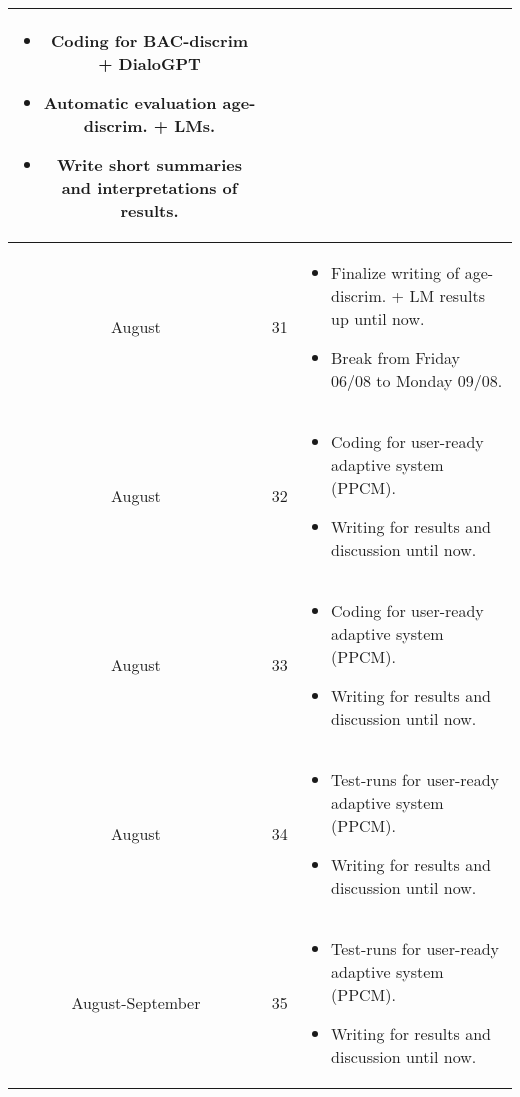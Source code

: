\begin{longtable}{| c | c | m{10cm} |}
\begin{itemize}
                                \item Coding for BAC-discrim + DialoGPT
                                \item Automatic evaluation age-discrim. + LMs.
                                \item Write short summaries and interpretations of results.
                            \end{itemize}\\
        \hline
        August & 31 & \begin{itemize}
                        \item Finalize writing of age-discrim. + LM results up until now.
                        \item Break from Friday 06/08 to Monday 09/08.
                      \end{itemize}\\
        \hline
        August & 32 & \begin{itemize}
                                \item Coding for user-ready adaptive system (PPCM).
                                \item Writing for results and discussion until now.
                      \end{itemize}\\
        \hline
        August & 33 & \begin{itemize}
                            \item Coding for user-ready adaptive system (PPCM).
                            \item Writing for results and discussion until now.
                       \end{itemize}\\
        \hline
        August & 34 & \begin{itemize}
                        \item Test-runs for user-ready adaptive system (PPCM).
                        \item Writing for results and discussion until now.
                      \end{itemize}\\
        \hline
        August-September & 35 & \begin{itemize}
                                    \item Test-runs for user-ready adaptive system (PPCM).
                                    \item Writing for results and discussion until now.

\end{itemize}
\end{longtable}

